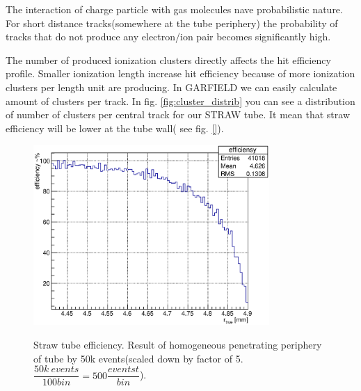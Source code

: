 \documentclass[]{article}
\begin{document}
	The interaction of charge particle with gas molecules nave probabilistic nature. For short distance tracks(somewhere at the tube periphery) the probability of tracks that do not produce any electron/ion pair becomes significantly high.
		
	The number of produced ionization clusters directly affects the hit efficiency profile. \cite{kozlinskiy} Smaller ionization length increase hit efficiency because of more ionization clusters per length unit are producing. In GARFIELD we can easily calculate amount of clusters per track. In fig. \ref{fig:cluster_distrib} you can see a distribution of number of clusters per central track for our STRAW tube. It mean that straw efficiency will be lower at the tube wall( see fig. \ref{}).
		

	\begin{figure}[h!]
	\centering
	\includegraphics[width=0.8\textwidth]{periffEff}
	\label{fig:efficiency}
	\caption{ Straw tube efficiency. Result of homogeneous penetrating periphery of tube by 50k events(scaled down by factor of 5. $\dfrac{50k~events}{100 bin}  = 500 \dfrac{eventst}{bin}$).}
	\end{figure}	
	
\end{document}
